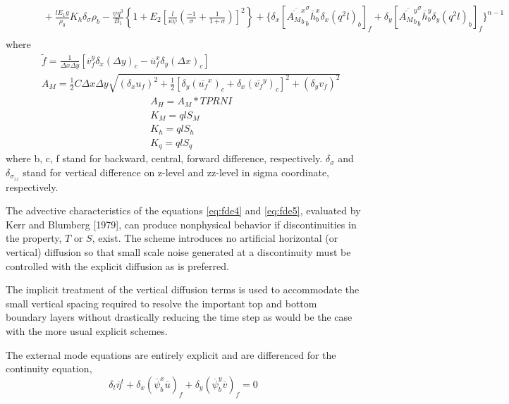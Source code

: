 \documentclass[oribibl]{llncs}
\begin{document}
\begin{eqnarray}
&&\ \ \ \ \ \ \ \  + \frac{l E_1 g}{\rho_0} K_h \delta_\sigma \rho_b - \frac{\psi q^3}{B_1} \left\{ 1+ E_2  \left[ \frac{l}{\kappa \psi} \left( \frac{-1}{\sigma} +\frac{1}{1+\sigma} \right) \right]^2 \right\} + \{\delta_x [ \overline{ \overline {A_M}^x_b }^\sigma_b {\overline{h}^x_b} \delta_x (q^2l)_b]_f + \delta_y [ \overline{ \overline {A_M}^y_b }^\sigma_b {\overline{h}^y_b } \delta_y (q^2l)_b]_f \}^{n-1} \nonumber \\ 
\label{eq:fde1}
\end{eqnarray}
where
\begin{eqnarray}
&&\tilde {f} = \frac{1}{\Delta x \Delta y} [ \overline {v}^y_f \delta_x(\Delta y)_c - \overline {u}^x_f \delta_y(\Delta x)_c ]  \\
&&A_M = \frac{1}{2} C \Delta x \Delta y \sqrt{  (\delta_xu_f)^2 + \frac{1}{2}[\delta_y (\overline{u_f}^x)_c+\delta_x (\overline{v_f}^y)_c]^2 + (\delta_yv_f)^2  } 
\end{eqnarray}
\begin{eqnarray}
&&A_H = A_M * TPRNI \\
&&K_M = qlS_M \\
&&K_h = qlS_h \\
&&K_q = qlS_q 
\end{eqnarray}
where b, c, f stand for backward, central, forward difference, respectively. ${\delta_\sigma}$ and ${\delta_{\sigma_{zz}}}$ stand for vertical difference on z-level and zz-level in sigma coordinate, respectively. 
 
The advective characteristics of the equations \ref{eq:fde4} and \ref{eq:fde5}, evaluated by Kerr and Blumberg [1979], can produce nonphysical behavior if discontinuities in the property, $T$ or $S$, exist. The scheme introduces no artificial horizontal (or vertical) diffusion so that small scale noise generated at a discontinuity must be controlled with the explicit diffusion as is preferred.

The implicit treatment of the vertical diffusion terms is used to accommodate the small vertical spacing required to resolve the important top and bottom boundary layers without drastically reducing the time step as would be the case with the more usual explicit schemes. 

The external mode equations are entirely explicit and are differenced for the continuity equation,
\begin{equation}
\delta_t \overline{\eta}^t + \delta_x (\overline{\psi}^x_b \overline{u})_f + \delta_y (\overline{\psi}^y_b \overline{v})_f = 0
\end{equation}
\end{document}
